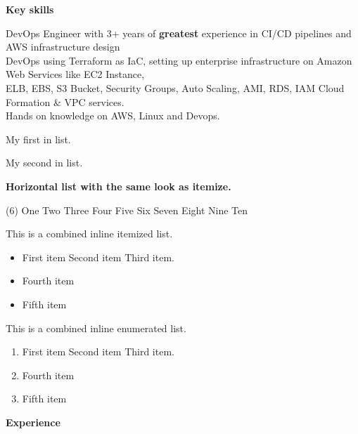 \documentclass[10pt,A4]{article}
\newcommand{\cvsection}[1]
{
	\begin{center}
		\large\textcolor{sectcol}{\textbf{#1}}
	\end{center}
}
\begin{document}
\cvsection{Key skills}
DevOps Engineer with 3+ years of \textbf{greatest} experience in CI/CD pipelines and AWS infrastructure design\\
DevOps using Terraform as IaC, setting up enterprise infrastructure on Amazon Web Services like EC2 Instance,\\ ELB, EBS, S3 Bucket, Security Groups, Auto Scaling, AMI, RDS, IAM Cloud Formation \& VPC services.\\
Hands on knowledge on AWS, Linux and Devops.

\begin{enumerate*}
  \item My first in list.
  \item My second in list.
\end{enumerate*}

\bfseries Horizontal list with the same look as itemize.\normalfont
\begin{tasks}[style=itemize, column-sep=-25mm, label-align=left, label-offset={2mm}, label-width={3mm}, item-indent={15mm}](6)%
\task One
\task Two
\task Three
\task Four
\task Five
\task Six
\task Seven
\task Eight
\task Nine
\task Ten
\end{tasks}

This is a combined inline itemized list.
\begin{itemize}
    \item First item \inlineitem Second item \inlineitem Third item.
    \item Fourth item
    \item Fifth item
\end{itemize}

This is a combined inline enumerated list.
\begin{enumerate}
    \item First item \inlineitem Second item \inlineitem Third item.
    \item Fourth item
    \item Fifth item
\end{enumerate}


%
%

\cvsection{Experience}
\end{document}
